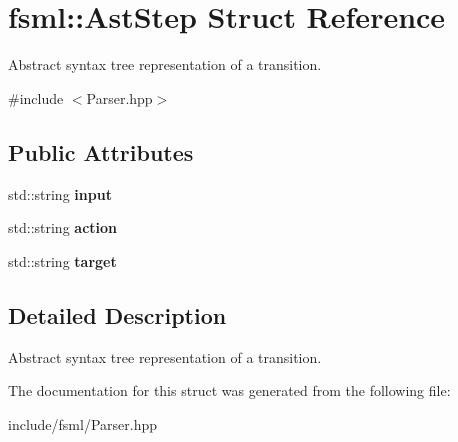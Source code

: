 \hypertarget{structfsml_1_1AstStep}{\section{fsml\-:\-:Ast\-Step Struct Reference}
\label{structfsml_1_1AstStep}
}


Abstract syntax tree representation of a transition.  




{\ttfamily \#include $<$Parser.\-hpp$>$}

\subsection*{Public Attributes}
\begin{DoxyCompactItemize}
\item 
\hypertarget{structfsml_1_1AstStep_a2244e46f2cff2fa65fda13931a377356}{std\-::string {\bfseries input}}\label{structfsml_1_1AstStep_a2244e46f2cff2fa65fda13931a377356}

\item 
\hypertarget{structfsml_1_1AstStep_a308747ad3a3acc808f6c654ff1942e96}{std\-::string {\bfseries action}}\label{structfsml_1_1AstStep_a308747ad3a3acc808f6c654ff1942e96}

\item 
\hypertarget{structfsml_1_1AstStep_ac7eb1fb884326a326da14c054d3f7777}{std\-::string {\bfseries target}}\label{structfsml_1_1AstStep_ac7eb1fb884326a326da14c054d3f7777}

\end{DoxyCompactItemize}


\subsection{Detailed Description}
Abstract syntax tree representation of a transition. 



The documentation for this struct was generated from the following file\-:\begin{DoxyCompactItemize}
\item 
include/fsml/Parser.\-hpp\end{DoxyCompactItemize}
